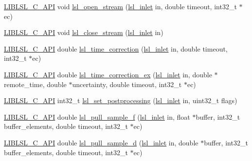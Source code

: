 \begin{DoxyCompactItemize}
\item 
\hyperlink{lsl__cpp_8h_aafd0ef1813e8be84a1420c4f1df64615}{L\+I\+B\+L\+S\+L\+\_\+\+C\+\_\+\+A\+PI} void \hyperlink{namespacelsl_ad72aa9d01ea937b413adf615322ce9a7}{lsl\+\_\+open\+\_\+stream} (\hyperlink{namespacelsl_a884a3363cfcba75d7ce8f00c1c4c54f1}{lsl\+\_\+inlet} in, double timeout, int32\+\_\+t $\ast$ec)
\item 
\hyperlink{lsl__cpp_8h_aafd0ef1813e8be84a1420c4f1df64615}{L\+I\+B\+L\+S\+L\+\_\+\+C\+\_\+\+A\+PI} void \hyperlink{namespacelsl_a3adefb15364dacbfa8f46b5f554ed4ac}{lsl\+\_\+close\+\_\+stream} (\hyperlink{namespacelsl_a884a3363cfcba75d7ce8f00c1c4c54f1}{lsl\+\_\+inlet} in)
\item 
\hyperlink{lsl__cpp_8h_aafd0ef1813e8be84a1420c4f1df64615}{L\+I\+B\+L\+S\+L\+\_\+\+C\+\_\+\+A\+PI} double \hyperlink{namespacelsl_a4a017b7c6d6fbe056b5394b1edff0994}{lsl\+\_\+time\+\_\+correction} (\hyperlink{namespacelsl_a884a3363cfcba75d7ce8f00c1c4c54f1}{lsl\+\_\+inlet} in, double timeout, int32\+\_\+t $\ast$ec)
\item 
\hyperlink{lsl__cpp_8h_aafd0ef1813e8be84a1420c4f1df64615}{L\+I\+B\+L\+S\+L\+\_\+\+C\+\_\+\+A\+PI} double \hyperlink{namespacelsl_aaa10a13a7b2aced436ba8a14c21af2bb}{lsl\+\_\+time\+\_\+correction\+\_\+ex} (\hyperlink{namespacelsl_a884a3363cfcba75d7ce8f00c1c4c54f1}{lsl\+\_\+inlet} in, double $\ast$remote\+\_\+time, double $\ast$uncertainty, double timeout, int32\+\_\+t $\ast$ec)
\item 
\hyperlink{lsl__cpp_8h_aafd0ef1813e8be84a1420c4f1df64615}{L\+I\+B\+L\+S\+L\+\_\+\+C\+\_\+\+A\+PI} int32\+\_\+t \hyperlink{namespacelsl_a36fe6c26cb8c696b658c87490d4c1059}{lsl\+\_\+set\+\_\+postprocessing} (\hyperlink{namespacelsl_a884a3363cfcba75d7ce8f00c1c4c54f1}{lsl\+\_\+inlet} in, uint32\+\_\+t flags)
\item 
\hyperlink{lsl__cpp_8h_aafd0ef1813e8be84a1420c4f1df64615}{L\+I\+B\+L\+S\+L\+\_\+\+C\+\_\+\+A\+PI} double \hyperlink{namespacelsl_a56fc49301c94b76f1c89ab041d26bef1}{lsl\+\_\+pull\+\_\+sample\+\_\+f} (\hyperlink{namespacelsl_a884a3363cfcba75d7ce8f00c1c4c54f1}{lsl\+\_\+inlet} in, float $\ast$buffer, int32\+\_\+t buffer\+\_\+elements, double timeout, int32\+\_\+t $\ast$ec)
\item 
\hyperlink{lsl__cpp_8h_aafd0ef1813e8be84a1420c4f1df64615}{L\+I\+B\+L\+S\+L\+\_\+\+C\+\_\+\+A\+PI} double \hyperlink{namespacelsl_a958abfca3463aaf5703230b472e8e988}{lsl\+\_\+pull\+\_\+sample\+\_\+d} (\hyperlink{namespacelsl_a884a3363cfcba75d7ce8f00c1c4c54f1}{lsl\+\_\+inlet} in, double $\ast$buffer, int32\+\_\+t buffer\+\_\+elements, double timeout, int32\+\_\+t $\ast$ec)

\end{DoxyCompactItemize}
